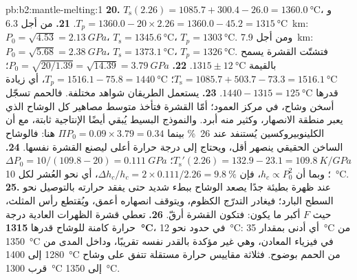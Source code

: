 \begin{solution}{pb:b2:mantle-melting:1}
\textbf{20.} $T_{\mathrm s}(2.26) = 1085.7 + 300.4 - 26.0 = \qty{1360.0}{\celsius}$،
و$T_p = 1360.0 - 20\times2.26 = 1360.0 - 45.2 = \qty{1315}{\celsius}$.
\textbf{21.} من أجل \qty{6.3}{km}: $P_0 = \sqrt{4.53} = \qty{2.13}{GPa}$، $T_{\mathrm s}
= \qty{1345.6}{\celsius}$، $T_p = \qty{1303}{\celsius}$. ومن أجل \qty{7.9}{km}: $P_0 =
\sqrt{5.68} = \qty{2.38}{GPa}$، $T_{\mathrm s} = \qty{1373.1}{\celsius}$، $T_p =
\qty{1326}{\celsius}$. فتشتّت القشرة يسمح بالقيمة $1315 \pm
\qty{12}{\celsius}$.
\textbf{22.} $P_0 = \sqrt{20/1.39} = \sqrt{14.39} = \qty{3.79}{GPa}$؛ $T_{\mathrm s} =
1085.7 + 503.7 - 73.3 = \qty{1516.1}{\celsius}$؛ $T_p = 1516.1 - 75.8 =
\qty{1440}{\celsius}$، أي زيادة قدرها $1440 - 1315 = \qty{125}{\celsius}$.
\textbf{23.} يستعمل الطريقان شواهد مختلفة. فالحمم تسجّل أسخن وشاح،
في مركز العمود؛ أمّا القشرة فتأخذ متوسط مصاهير كل الوشاح الذي
يعبر منطقة الانصهار، وكثير منه أبرد. والنموذج البسيط يُبقي أيضًا
الإنتاجية ثابتة، مع أن الكلينوبيروكسين يُستنفد عند \qty{26}{\percent}
بينما $\Pi P_0 = 0.09\times3.79 = 0.34$ هنا: فالوشاح الساخن الحقيقي ينصهر أقل، ويحتاج إلى
درجة حرارة أعلى ليصنع القشرة نفسها.
\textbf{24.} $T_{\mathrm s}'(2.26) = 132.9 - 23.1 = \qty{109.8}{K/GPa}$؛ $\Delta P_0 =
10/(109.8 - 20) = \qty{0.111}{GPa}$؛ وبما أن $h_c \propto P_0^2$، فإن $\Delta h_c/h_c =
2\times0.111/2.26 = \qty{9.8}{\percent}$، أي نحو العُشر لكل \qty{10}{\celsius}.
\textbf{25.} عند ظهرة بطيئة جدًا يصعد الوشاح ببطء شديد حتى يفقد حرارته
بالتوصيل نحو السطح البارد؛ فيغادر التدرّج الكظوم، ويتوقف انصهاره
أعمق، ويُقتطع رأس المثلث، حيث $F$ أكبر ما يكون: فتكون القشرة
أرقّ.
\textbf{26.} تعطي قشرة الظهرات العادية درجة حرارة كامنة للوشاح قدرها
\textbf{\qty[text-series-to-math=true]{1315}{\celsius}}، في حدود نحو
\qty{12}{\celsius}: أي أدنى بمقدار \qty{35}{\celsius} من \qty{1350}{\celsius} في فيزياء
المعادن، وهي غير مؤكدة بالقدر نفسه تقريبًا، وداخل المدى من 1280 إلى
\qty{1400}{\celsius} من الحمم بوضوح. فثلاثة مقاييس حرارة مستقلة تتفق على وشاح
قرب \qty{1300}{\celsius} إلى \qty{1350}{\celsius}.
\end{solution}
